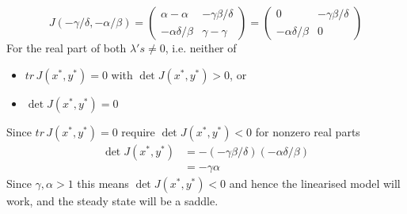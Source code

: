 \documentclass{/home/janmebows/Documents/LatexTemplates/myassignment}
\begin{document}
\begin{enumerate}
\begin{enumerate}
		\[J(-\gamma/\delta,-\alpha/\beta) = \begin{pmatrix}
			\alpha -\alpha & -\gamma\beta/\delta\\-\alpha \delta/\beta & \gamma - \gamma 
		\end{pmatrix} = \begin{pmatrix}
			0&-\gamma \beta/\delta\\ -\alpha \delta/\beta & 0
		\end{pmatrix}\]
		For the real part of both $\lambda's \neq 0$, i.e. neither of
		\begin{itemize}
		\item $tr\, J(x^*,y^*)=0 $ with $\det J(x^*,y^*) >0$, or
		\item $\det J(x^*,y^*) =0$
		\end{itemize}
		Since $tr\, J(x^*,y^*) =0$ require $\det J(x^*,y^*) < 0$ for nonzero real parts
		\begin{align*}
			\det J(x^*,y^*) &= -(-\gamma \beta/\delta)(-\alpha \delta/\beta)\\
			&= -\gamma \alpha
		\end{align*}
		Since $\gamma, \alpha > 1$ this means $\det J(x^*,y^*) <0$ and hence the linearised model will work, and the steady state will be a saddle.
		

\end{enumerate}
\end{enumerate}
\end{document}
